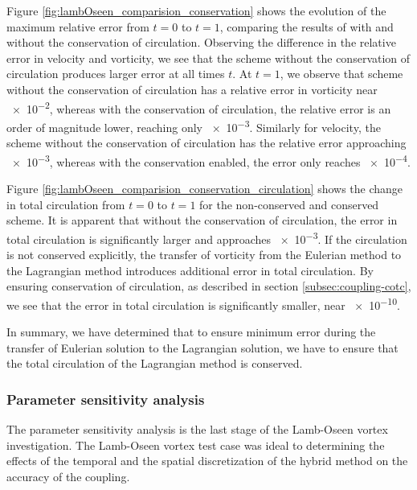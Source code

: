 Figure \ref{fig:lambOseen_comparision_conservation} shows the evolution of the maximum relative error from $t=0$ to $t=1$, comparing the results of with and without the conservation of circulation. Observing the difference in the relative error in velocity and vorticity, we see that the scheme without the conservation of circulation produces larger error at all times $t$. At $t=1$, we observe that scheme without the conservation of circulation has a relative error in vorticity near \num{e-2}, whereas with the conservation of circulation, the relative error is an order of magnitude lower, reaching only \num{e-3}. Similarly for velocity, the scheme without the conservation of circulation has the relative error approaching \num{e-3}, whereas with the conservation enabled, the error only reaches \num{e-4}. 

Figure \ref{fig:lambOseen_comparision_conservation_circulation} shows the change in total circulation from $t=0$ to $t=1$ for the non-conserved and conserved scheme. It is apparent that without the conservation of circulation, the error in total circulation is significantly larger and approaches \num{e-3}. If the circulation is not conserved explicitly, the transfer of vorticity from the Eulerian method to the Lagrangian method introduces additional error in total circulation. By ensuring conservation of circulation, as described in section \ref{subsec:coupling-cotc}, we see that the error in total circulation is significantly smaller, near \num{e-10}. %

In summary, we have determined that to ensure minimum error during the transfer of Eulerian solution to the Lagrangian solution, we have to ensure that the total circulation of the Lagrangian method is conserved.

\subsubsection{Parameter sensitivity analysis}
\label{subsubsec:psa}

The parameter sensitivity analysis is the last stage of the Lamb-Oseen vortex investigation. The Lamb-Oseen vortex test case was ideal to determining the effects of the temporal and the spatial discretization of the hybrid method on the accuracy of the coupling. 

